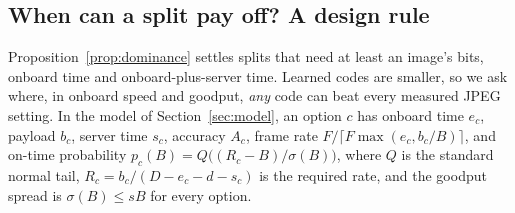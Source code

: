 \subsection{When can a split pay off? A design rule}\label{sec:design-rule}
Proposition~\ref{prop:dominance} settles splits that need at least an image's bits, onboard time and onboard-plus-server
time. Learned codes are smaller, so we ask where, in onboard speed and goodput, \emph{any} code can beat every
measured JPEG setting. In the model of Section~\ref{sec:model}, an option $c$ has onboard time $e_c$, payload $b_c$,
server time $s_c$, accuracy $A_c$, frame rate $F/\lceil F\max(e_c, b_c/B)\rceil$, and on-time probability
$p_c(B) = Q\big((R_c - B)/\sigma(B)\big)$, where $Q$ is the standard normal tail, $R_c = b_c/(D - e_c - d - s_c)$ is the
required rate, and the goodput spread is $\sigma(B) \le sB$ for every option.

